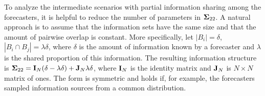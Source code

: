 \documentclass[12pt]{article}
\theoremstyle{definition}
\theoremstyle{definition}
\def\probit{p_{\rm probit}}
\begin{document}
To analyze the intermediate scenarios with partial information sharing among the forecasters, it is helpful to reduce the number of parameters in ${\bf\Sigma}_{22}$. A natural approach is to assume that the
information sets have the same size and that the amount of pairwise overlap
is constant. More specifically, let $|B_{i}| =
\delta$, $|B_{i} \cap B_{j}| = \lambda \delta$, where $\delta$ is the amount of information known by a forecaster and
$\lambda$ is the shared proportion of this information. The resulting information structure is ${\bf\Sigma}_{22} = {\bf I}_N(\delta - \lambda \delta) + {\bf J}_N \lambda \delta$, where ${\bf I}_N$ is the identity matrix and ${\bf J}_N$ is $N \times N$ matrix of ones.
The form is symmetric and holds if, for example, the
forecasters sampled information sources from a common distribution. 
\end{document}
